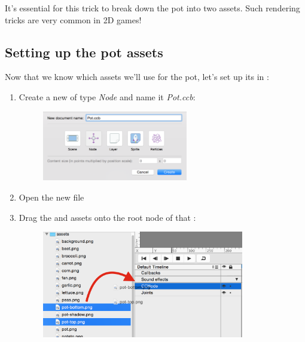 It's essential for this trick to break down the pot into two assets. Such
rendering tricks are very common in 2D games!

\subsection{Setting up the pot assets}
Now that we know which assets we'll use for the pot, let's set up
its \ccbfile{} in \SB{}:
\begin{leftbar}
\begin{enumerate}
  \item Create a new \ccbfile{} of type \textit{Node} and name it
  \textit{Pot.ccb}: \begin{figure}[H]
    \centering
    \includegraphics[width=180pt]{images/Chapter3/ccp_pot_file.png}
  \end{figure}
  \item Open the new  file
  \item Drag the  and  assets onto
  the root node of that \ccbfile{}: \begin{figure}[H]
    \centering
    \includegraphics[width=250pt]{images/Chapter3/drag_pot_assets.png}
  \end{figure}
  

\end{enumerate}
\end{leftbar}
